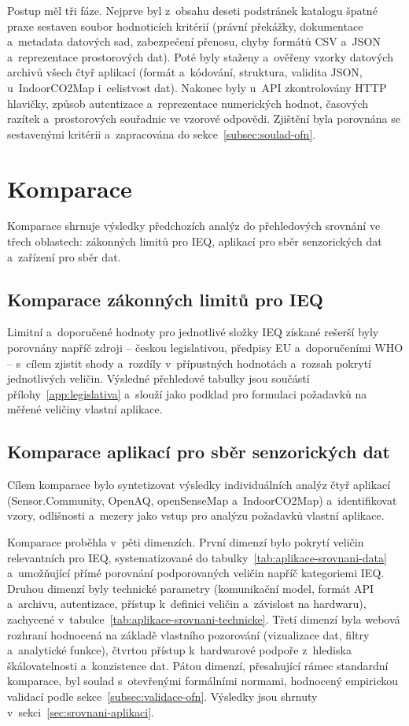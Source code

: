 Postup měl tři fáze. Nejprve byl z~obsahu deseti podstránek katalogu špatné praxe sestaven soubor hodnoticích kritérií (právní překážky, dokumentace a~metadata datových sad, zabezpečení přenosu, chyby formátů CSV a~JSON a~reprezentace prostorových dat). Poté byly staženy a~ověřeny vzorky datových archivů všech čtyř aplikací (formát a~kódování, struktura, validita JSON, u~IndoorCO2Map i~celistvost dat). Nakonec byly u~API zkontrolovány HTTP hlavičky, způsob autentizace a~reprezentace numerických hodnot, časových razítek a~prostorových souřadnic ve vzorové odpovědi. Zjištění byla porovnána se sestavenými kritérii a~zapracována do sekce~\ref{subsec:soulad-ofn}.

\section{Komparace}

Komparace shrnuje výsledky předchozích analýz do přehledových srovnání ve třech oblastech: zákonných limitů pro IEQ, aplikací pro sběr senzorických dat a~zařízení pro sběr dat.

\FloatBarrier
\subsection{Komparace zákonných limitů pro IEQ}

Limitní a~doporučené hodnoty pro jednotlivé složky IEQ získané rešerší byly porovnány napříč zdroji -- českou legislativou, předpisy EU a~doporučeními WHO -- s~cílem zjistit shody a~rozdíly v~přípustných hodnotách a~rozsah pokrytí jednotlivých veličin. Výsledné přehledové tabulky jsou součástí přílohy~\ref{app:legislativa} a~slouží jako podklad pro formulaci požadavků na měřené veličiny vlastní aplikace.

\FloatBarrier
\subsection{Komparace aplikací pro sběr senzorických dat}

Cílem komparace bylo syntetizovat výsledky individuálních analýz čtyř aplikací (Sensor.Community, OpenAQ, openSenseMap a~IndoorCO2Map) a~identifikovat vzory, odlišnosti a~mezery jako vstup pro analýzu požadavků vlastní aplikace.

Komparace proběhla v~pěti dimenzích. První dimenzí bylo pokrytí veličin relevantních pro IEQ, systematizované do tabulky~\ref{tab:aplikace-srovnani-data} a~umožňující přímé porovnání podporovaných veličin napříč kategoriemi IEQ. Druhou dimenzí byly technické parametry (komunikační model, formát API a~archivu, autentizace, přístup k~definici veličin a~závislost na hardwaru), zachycené v~tabulce~\ref{tab:aplikace-srovnani-technicke}. Třetí dimenzí byla webová rozhraní hodnocená na základě vlastního pozorování (vizualizace dat, filtry a~analytické funkce), čtvrtou přístup k~hardwarové podpoře z~hlediska škálovatelnosti a~konzistence dat. Pátou dimenzí, přesahující rámec standardní komparace, byl soulad s~otevřenými formálními normami, hodnocený empirickou validací podle sekce~\ref{subsec:validace-ofn}. Výsledky jsou shrnuty v~sekci~\ref{sec:srovnani-aplikaci}.

